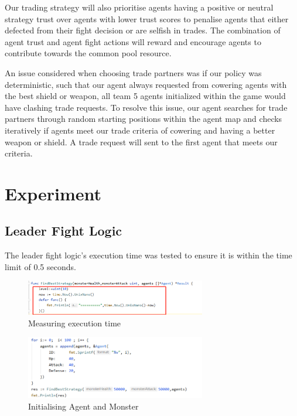 \noindent Our trading strategy will also prioritise agents having a positive or neutral strategy trust over agents with lower trust scores to penalise agents that either defected from their fight decision or are selfish in trades. The combination of agent trust and agent fight actions will reward and encourage agents to contribute towards the common pool resource.

\noindent An issue considered when choosing trade partners was if our policy was deterministic, such that our agent always requested from cowering agents with the best shield or weapon, all team 5 agents initialized within the game would have clashing trade requests. To resolve this issue, our agent searches for trade partners through random starting positions within the agent map and checks iteratively if agents meet our trade criteria of cowering and having a better weapon or shield. A trade request will sent to the first agent that meets our criteria.


\section{Experiment}

\subsection{Leader Fight Logic}
The leader fight logic's execution time was tested to ensure it is within the time limit of 0.5 seconds.

\begin{figure}[htb]
    \centering
    \includegraphics[width=0.7\textwidth]{008_team_5_agent_design/images/10.png}
    \caption{Measuring execution time}
    \label{testingexecutiontime}
\end{figure}

\begin{figure}[!ht]
    \centering
    \includegraphics[width=0.7\textwidth]{008_team_5_agent_design/images/11.png}
    \caption{Initialising Agent and Monster}
    \label{initialisingagentandmonster}
\end{figure}

